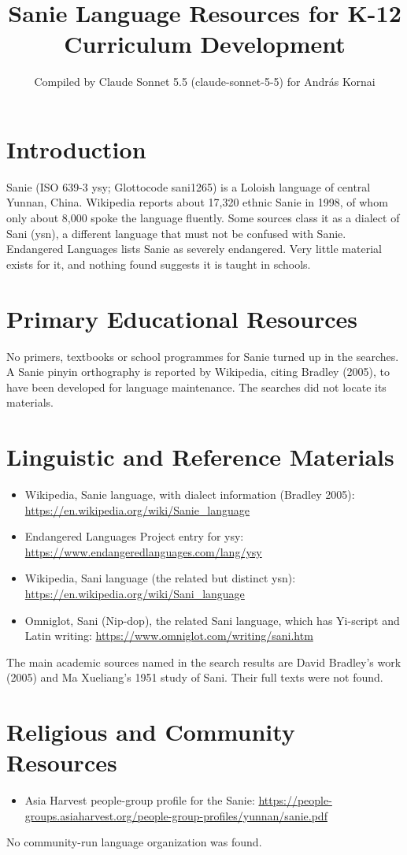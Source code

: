 \documentclass[12pt]{article}
\title{Sanie Language Resources for K-12 Curriculum Development}
\author{Compiled by Claude Sonnet 5.5 (claude-sonnet-5-5) for Andr\'as Kornai}
\date{}
\begin{document}
\maketitle

\section{Introduction}
Sanie (ISO 639-3 ysy; Glottocode sani1265) is a Loloish language of central Yunnan, China. Wikipedia reports about 17,320 ethnic Sanie in 1998, of whom only about 8,000 spoke the language fluently. Some sources class it as a dialect of Sani (ysn), a different language that must not be confused with Sanie. Endangered Languages lists Sanie as severely endangered. Very little material exists for it, and nothing found suggests it is taught in schools.

\section{Primary Educational Resources}
No primers, textbooks or school programmes for Sanie turned up in the searches. A Sanie pinyin orthography is reported by Wikipedia, citing Bradley (2005), to have been developed for language maintenance. The searches did not locate its materials.

\section{Linguistic and Reference Materials}
\begin{itemize}
\item Wikipedia, Sanie language, with dialect information (Bradley 2005): \url{https://en.wikipedia.org/wiki/Sanie_language}
\item Endangered Languages Project entry for ysy: \url{https://www.endangeredlanguages.com/lang/ysy}
\item Wikipedia, Sani language (the related but distinct ysn): \url{https://en.wikipedia.org/wiki/Sani_language}
\item Omniglot, Sani (Nip-dop), the related Sani language, which has Yi-script and Latin writing: \url{https://www.omniglot.com/writing/sani.htm}
\end{itemize}
The main academic sources named in the search results are David Bradley's work (2005) and Ma Xueliang's 1951 study of Sani. Their full texts were not found.

\section{Religious and Community Resources}
\begin{itemize}
\item Asia Harvest people-group profile for the Sanie: \url{https://people-groups.asiaharvest.org/people-group-profiles/yunnan/sanie.pdf}
\end{itemize}
No community-run language organization was found.
\end{document}
